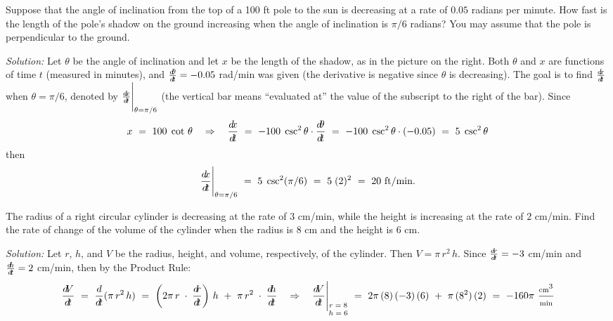 \begin{exmp}\label{exmp:relrate2}
\noindent Suppose that the angle of inclination from the top of a 100 ft pole
to the sun is decreasing at a rate of $0.05$ radians per minute. How fast is the
length of the pole's shadow on the ground increasing when the angle of
inclination is $\pi/6$ radians? You may assume that the pole is perpendicular to
the ground.\vspace{1mm}
\par\noindent\emph{Solution:} Let $\theta$ be the angle of inclination and let
$x$ be the length of the shadow, as in the picture on the right. Both $\theta$
and $x$ are functions of time $t$ (measured in minutes), and
$\frac{d\negmedspace\theta}{d\!t} = -0.05$ rad/min was given (the derivative is
negative since $\theta$ is decreasing). The goal is to find $\frac{d\negmedspace x}{d\!t}$ when
$\theta = \pi/6$, denoted by $\frac{d\negmedspace x}{d\!t}\Biggr|_{\theta=\pi/6}$ (the vertical bar
means ``evaluated at'' the value of the subscript to the right of the bar).
Since
\[
x ~=~ 100\;\cot\,\theta \quad\Rightarrow\quad
\frac{d\negmedspace x}{d\!t} ~=~ -100\;\csc^2\theta \cdot \frac{d\negmedspace\theta}{d\!t}
~=~ -100\;\csc^2\theta \cdot (-0.05) ~=~ 5\;\csc^2\theta
\]
then
\[
\frac{d\negmedspace x}{d\!t}\Biggr|_{\theta=\pi/6} ~=~ 5\;\csc^2(\pi/6) ~=~ 5\;(2)^2 ~=~ 20~\text{ft/min} .
\]
\end{exmp}
\divider
\newpage
\begin{exmp}\label{exmp:relrate3}
\noindent The radius of a right circular cylinder is decreasing at the rate of
$3$ cm/min, while the height is increasing at the rate of $2$ cm/min. Find the
rate of change of the volume of the cylinder when the radius is $8$ cm and the
height is $6$ cm.\vspace{1mm}
\par\noindent\emph{Solution:} Let $r$, $h$, and $V$ be the radius, height, and
volume, respectively, of the cylinder. Then $V = \pi\,r^2 \,h$. Since
$\frac{d\!r}{d\!t} = -3$ cm/min and $\frac{d\negmedspace h}{d\!t} = 2$ cm/min, then
by the Product Rule:
\[
  \dVdt ~=~ \ddt (\pi\,r^2 \,h) ~=~ \left( 2\pi \,r\;\cdot\;\drdt\right)\,h ~+~
  \pi\,r^2 \;\cdot\;\frac{d\negmedspace h}{\dt} \quad\Rightarrow\quad
  \dVdt\Biggr|_{\text{\scriptsize{$\begin{matrix}r=8\\h=6\end{matrix}$}}} ~=~
  2\pi\,(8)\,(-3)\,(6) ~+~ \pi\,(8^2)\,(2) ~=~
 -160\pi~\frac{\text{\scriptsize cm}^3}{\text{\scriptsize min}}
\]
\end{exmp}
\divider
\vspace{2mm}
 
